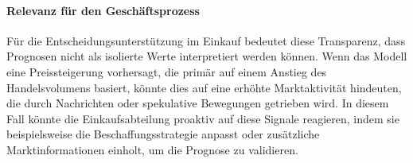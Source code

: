 \paragraph{Relevanz für den Geschäftsprozess}
Für die Entscheidungsunterstützung im Einkauf bedeutet diese Transparenz, dass Prognosen nicht als isolierte Werte interpretiert werden können. Wenn das Modell eine Preissteigerung vorhersagt, die primär auf einem Anstieg des Handelsvolumens basiert, könnte dies auf eine erhöhte Marktaktivität hindeuten, die durch Nachrichten oder spekulative Bewegungen getrieben wird. In diesem Fall könnte die Einkaufsabteilung proaktiv auf diese Signale reagieren, indem sie beispielsweise die Beschaffungsstrategie anpasst oder zusätzliche Marktinformationen einholt, um die Prognose zu validieren.

